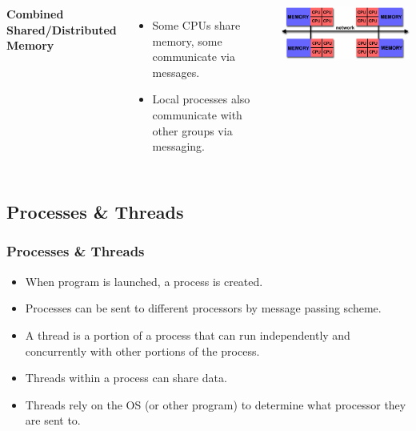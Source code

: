 \documentclass{beamer}
\begin{document}
\begin{frame}
\begin{columns}[t]
\textbf{Combined Shared/Distributed Memory}
\begin{itemize}
\item Some CPUs share memory, some communicate via messages.
\item Local processes also communicate with other groups via messaging.
\end{itemize}
\includegraphics[width =\textwidth]{com_shared.png}

\end{columns}
\end{frame}

\subsection{Processes \& Threads}

\begin{frame}
\frametitle{Processes \& Threads}
\begin{itemize}
\item When program is launched, a {\color{red}process} is created.
\item {\color{red} Processes} can be sent to different processors by message passing scheme.
\item A {\color{green} thread} is a {\color{blue} portion} of a {\color{red} process} that can run {\color{blue} independently and concurrently} with other portions of the {\color{red} process}.
\item {\color{green} Threads} within a {\color{red} process} can share data.
\item {\color{green} Threads} rely on the OS (or other program) to determine what processor they are sent to.
\end{itemize}
\end{frame}

\end{document}
